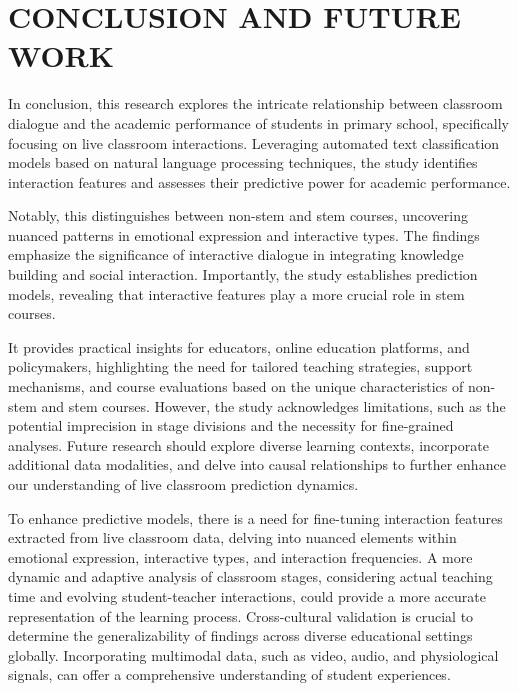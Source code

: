 \chapter[CONCLUSION AND FUTURE WORK]
{\fontsize{16}{12}\vspace{-.59in}\selectfont CONCLUSION AND FUTURE WORK}
\par \hspace{1cm}In conclusion, this research explores the intricate relationship between classroom dialogue and the academic performance of students in primary school, specifically focusing on live classroom interactions. Leveraging automated text classification models based on natural language processing techniques, the study identifies interaction features and assesses their predictive power for academic performance.
\par Notably, this distinguishes between non-stem and stem courses, uncovering nuanced patterns in emotional expression and interactive types. The findings emphasize the significance of interactive dialogue in integrating knowledge building and social interaction. Importantly, the study establishes prediction models, revealing that interactive features play a more crucial role in stem courses. 
\par It provides practical insights for educators, online education platforms, and policymakers, highlighting the need for tailored teaching strategies, support mechanisms, and course evaluations based on the unique characteristics of non-stem and stem courses. However, the study acknowledges limitations, such as the potential imprecision in stage divisions and the necessity for fine-grained analyses. Future research should explore diverse learning contexts, incorporate additional data modalities, and delve into causal relationships to further enhance our understanding of live classroom prediction dynamics.
 \par To enhance predictive models, there is a need for fine-tuning interaction features extracted from live classroom data, delving into nuanced elements within emotional expression, interactive types, and interaction frequencies. A more dynamic and adaptive analysis of classroom stages, considering actual teaching time and evolving student-teacher interactions, could provide a more accurate representation of the learning process. Cross-cultural validation is crucial to determine the generalizability of findings across diverse educational settings globally. Incorporating multimodal data, such as video, audio, and physiological signals, can offer a comprehensive understanding of student experiences.
